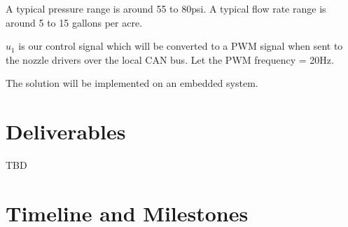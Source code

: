 A typical pressure range is around 55 to 80psi.
A typical flow rate range is around 5 to 15 gallons per acre.






$u_1$ is our control signal which will be converted to a PWM signal when sent to the nozzle drivers over the local CAN bus. Let the PWM frequency = 20Hz.



The solution will be implemented on an embedded system.

\section{Deliverables}
\label{sec:deliverables}

TBD

\section{Timeline and Milestones}
\label{sec:timeline}



